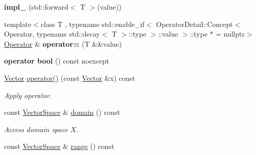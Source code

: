 \begin{DoxyCompactItemize}
\item 
\hypertarget{classSpacy_1_1Operator_a5366af2ad8250526eb713521fb50fe96}{{\bfseries impl\-\_\-} (std\-::forward$<$ T $>$(value))}\label{classSpacy_1_1Operator_a5366af2ad8250526eb713521fb50fe96}

\item 
\hypertarget{classSpacy_1_1Operator_a05ad03a9a9f680740872ebcd580823df}{{\footnotesize template$<$class T , typename std\-::enable\-\_\-if$<$ Operator\-Detail\-::\-Concept$<$ Operator, typename std\-::decay$<$ T $>$\-::type $>$\-::value $>$\-::type $\ast$  = nullptr$>$ }\\\hyperlink{classSpacy_1_1Operator}{Operator} \& {\bfseries operator=} (T \&\&value)}\label{classSpacy_1_1Operator_a05ad03a9a9f680740872ebcd580823df}

\item 
\hypertarget{classSpacy_1_1Operator_a001d31b07dd53fab2d0681cb8d6c9f6f}{{\bfseries operator bool} () const noexcept}\label{classSpacy_1_1Operator_a001d31b07dd53fab2d0681cb8d6c9f6f}

\item 
\hypertarget{classSpacy_1_1Operator_a2ab6072d6f9d98e0d5590531c080e3ad}{\hyperlink{classSpacy_1_1Vector}{Vector} \hyperlink{classSpacy_1_1Operator_a2ab6072d6f9d98e0d5590531c080e3ad}{operator()} (const \hyperlink{classSpacy_1_1Vector}{Vector} \&x) const }\label{classSpacy_1_1Operator_a2ab6072d6f9d98e0d5590531c080e3ad}

\begin{DoxyCompactList}\small\item\em Apply operator. \end{DoxyCompactList}\item 
\hypertarget{classSpacy_1_1Operator_a3b3d457bee48adf00d683a6aec4aa841}{const \hyperlink{classSpacy_1_1VectorSpace}{Vector\-Space} \& \hyperlink{classSpacy_1_1Operator_a3b3d457bee48adf00d683a6aec4aa841}{domain} () const }\label{classSpacy_1_1Operator_a3b3d457bee48adf00d683a6aec4aa841}

\begin{DoxyCompactList}\small\item\em Access domain space $X$. \end{DoxyCompactList}\item 
\hypertarget{classSpacy_1_1Operator_a8cf3b1e3b6c5c6ab5ddc09224ed8ab24}{const \hyperlink{classSpacy_1_1VectorSpace}{Vector\-Space} \& \hyperlink{classSpacy_1_1Operator_a8cf3b1e3b6c5c6ab5ddc09224ed8ab24}{range} () const }\label{classSpacy_1_1Operator_a8cf3b1e3b6c5c6ab5ddc09224ed8ab24}


\end{DoxyCompactItemize}
